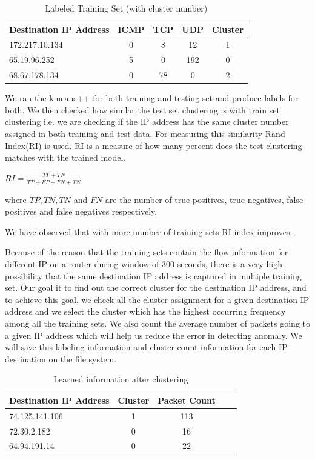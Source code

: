 \documentclass[10pt,oneside,a4paper]{article}
\begin{document}
\begin{table}[H]
\centering
  \begin{tabular}{| l | c | c | c | c |}
    \hline
    {Destination IP Address}  &ICMP  &TCP &UDP  &Cluster \\
    \hline
    172.217.10.134  & 0     & 8     & 12  &1  \\ \hline
    65.19.96.252    & 5     & 0     & 192 &0  \\ \hline
    68.67.178.134   & 0     & 78    & 0   &2  \\ \hline
  \end{tabular}
\caption{Labeled Training Set (with cluster number)} \label{table:labeled-set}
\end{table}


We ran the kmeans++ for both training and testing set and produce labels for both. We then checked how similar the test set clustering is with train set clustering i.e. we are checking if the IP address has the same cluster number assigned in both training and test data. For measuring this similarity Rand Index(RI)\cite{ri-index} is used. RI is a measure of how many percent does the test clustering matches with the trained model.

\hspace{4cm} $RI={\frac {TP+TN}{TP+FP+FN+TN}}$

where $TP, TN, TN$ and $FN$ are the number of true positives, true negatives, false positives and false negatives respectively.

We have observed that with more number of training sets RI index improves.

Because of the reason that the training sets contain the flow information for different IP on a router during window of 300 seconds, there is a very high possibility that the same destination IP address is captured in multiple training set. Our goal it to find out the correct cluster for the destination IP address, and to achieve this goal, we check all the cluster assignment for a given destination IP address and we select the cluster which has the highest occurring frequency among all the training sets. We also count the average number of packets going to a given IP address which will help us reduce the error in detecting anomaly. We will save this labeling information and cluster count information for each IP destination on the file system.

\begin{table}[H]
\centering
  \begin{tabular}{| l | c | c | c | c |}
    \hline
    {Destination IP Address}  &Cluster  &Packet Count \\
    \hline
    74.125.141.106  & 1     & 113  \\ \hline
    72.30.2.182     & 0     & 16   \\ \hline
    64.94.191.14    & 0     & 22   \\ \hline
  \end{tabular}
\caption{Learned information after clustering} \label{table:learned-clustering}
\end{table}
\end{document}
